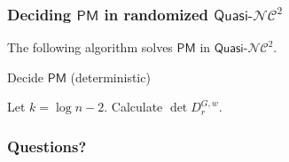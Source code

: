 \documentclass{beamer}
\theoremstyle{remark}
\newcommand{\dpm}{\mathsf{PM}}
\newcommand{\nc}{{\mathcal{NC}}}
\begin{document}
\begin{frame}
  \frametitle{Deciding $\dpm$ in randomized $\textsf{Quasi-}\nc^2$}
  The following algorithm solves $\dpm$ in $\textsf{Quasi-}\nc^2$.

  \begin{algorithm}[H]
    \caption{Decide $\dpm$ (deterministic)}
    \begin{algorithmic}
      \STATE Let $k = \log n - 2$.
      \STATE Calculate $\det D_r^{G, w}$.
      \ENDIF
      \ENDFOR
    \end{algorithmic}
  \end{algorithm}
\end{frame}

\begin{frame}
  \frametitle{Questions?}
\end{frame}
\end{document}
